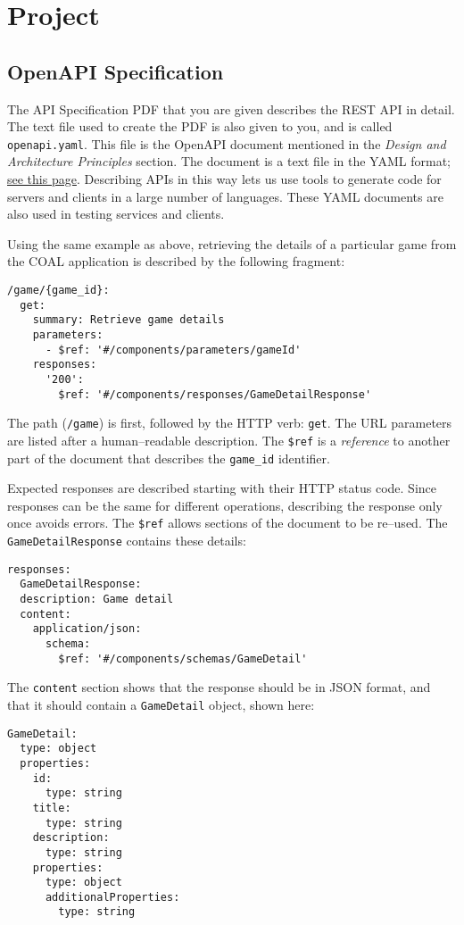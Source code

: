 \documentclass{article}
\newcommand{\enterProblemHeader}[1]{
}
\newcommand{\exitProblemHeader}[1]{
\nobreak\extramarks{#1}{}\nobreak
}
\newcounter{homeworkProblemCounter} %
\newcommand{\homeworkProblemName}{}
\newenvironment{homeworkProblem}[1][Problem \arabic{homeworkProblemCounter}]{ %
\stepcounter{homeworkProblemCounter} %
\renewcommand{\homeworkProblemName}{#1} %
\section{\homeworkProblemName} %
\enterProblemHeader{\homeworkProblemName} %
}{
\exitProblemHeader{\homeworkProblemName} %
}
\newcommand{\homeworkSectionName}{}
\newenvironment{homeworkSection}[1]{ %
\renewcommand{\homeworkSectionName}{#1} %
\subsection{\homeworkSectionName} %
\enterProblemHeader{\homeworkProblemName\ [\homeworkSectionName]} %
}{
\enterProblemHeader{\homeworkProblemName} %
}
\begin{document}
\begin{homeworkProblem}[Project]
\begin{homeworkSection}{OpenAPI Specification}
	The API Specification PDF that you are given describes the REST API in detail. The text file used to create the PDF is also given to you, and is called \texttt{openapi.yaml}. This file is the OpenAPI document mentioned in the \textit{Design and Architecture Principles} section. The document is a text file in the YAML format; \href{https://en.wikipedia.org/wiki/YAML}{see this page}. Describing APIs in this way lets us use tools to generate code for servers and clients in a large number of languages. These YAML documents are also used in testing services and clients.

	Using the same example as above, retrieving the details of a particular game from the COAL application is described by the following fragment:
\begin{verbatim}
/game/{game_id}:
  get:
    summary: Retrieve game details
    parameters:
      - $ref: '#/components/parameters/gameId'
    responses:
      '200':
        $ref: '#/components/responses/GameDetailResponse'
\end{verbatim}

The path (\texttt{/game}) is first, followed by the HTTP verb: \texttt{get}. The URL parameters are listed after a human--readable description. The \texttt{\$ref} is a \textit{reference} to another part of the document that describes the \texttt{game\_id} identifier.

Expected responses are described starting with their HTTP status code. Since responses can be the same for different operations, describing the response only once avoids errors. The \texttt{\$ref} allows sections of the document to be re--used. The \texttt{GameDetailResponse} contains these details:

\begin{verbatim}
responses:
  GameDetailResponse:
  description: Game detail
  content:
    application/json:
      schema:
        $ref: '#/components/schemas/GameDetail'
\end{verbatim}

The \texttt{content} section shows that the response should be in JSON format, and that it should contain a \texttt{GameDetail} object, shown here:

\begin{verbatim}
GameDetail:
  type: object
  properties:
    id:
      type: string
    title:
      type: string
    description:
      type: string
    properties:
      type: object
      additionalProperties:
        type: string
\end{verbatim}


\end{homeworkSection}
\end{homeworkProblem}
\end{document}
